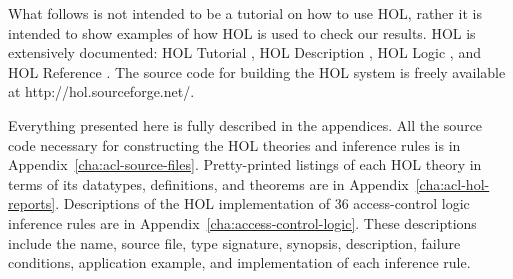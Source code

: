 
What follows is not intended to be a tutorial on how to use HOL,
rather it is intended to show examples of how HOL is used to check our
results. HOL is extensively documented: HOL Tutorial
\cite{HOLTutorial}, HOL Description \cite{HOLDescription}, HOL Logic
\cite{HOLLogic}, and HOL Reference \cite{HOLReference}. The source
code for building the HOL system is freely available at
\textsf{http://hol.sourceforge.net/}.

Everything presented here is fully described in the appendices. All
the source code necessary for constructing the HOL theories and
inference rules is in
Appendix~\ref{cha:acl-source-files}. Pretty-printed listings of each
HOL theory in terms of its datatypes, definitions, and theorems are in
Appendix~\ref{cha:acl-hol-reports}. Descriptions of the HOL
implementation of 36 access-control logic inference rules are in
Appendix~\ref{cha:access-control-logic}. These descriptions include
the name, source file, type signature, synopsis, description, failure
conditions, application example, and implementation of each inference
rule.


